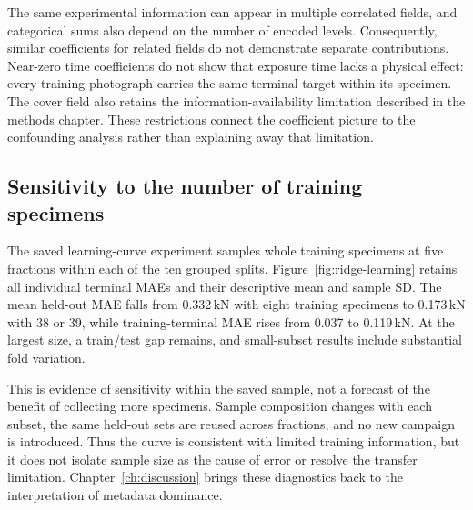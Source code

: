 The same experimental information can appear in multiple correlated fields, and categorical sums also depend on the number of encoded levels. Consequently, similar coefficients for related fields do not demonstrate separate contributions. Near-zero time coefficients do not show that exposure time lacks a physical effect: every training photograph carries the same terminal target within its specimen. The cover field also retains the information-availability limitation described in the methods chapter. These restrictions connect the coefficient picture to the confounding analysis rather than explaining away that limitation.

\subsection{Sensitivity to the number of training specimens}
The saved learning-curve experiment samples whole training specimens at five fractions within each of the ten grouped splits. Figure~\ref{fig:ridge-learning} retains all individual terminal MAEs and their descriptive mean and sample SD. The mean held-out MAE falls from 0.332\,kN with eight training specimens to 0.173\,kN with 38 or 39, while training-terminal MAE rises from 0.037 to 0.119\,kN. At the largest size, a train/test gap remains, and small-subset results include substantial fold variation.


This is evidence of sensitivity within the saved sample, not a forecast of the benefit of collecting more specimens. Sample composition changes with each subset, the same held-out sets are reused across fractions, and no new campaign is introduced. Thus the curve is consistent with limited training information, but it does not isolate sample size as the cause of error or resolve the transfer limitation. Chapter~\ref{ch:discussion} brings these diagnostics back to the interpretation of metadata dominance.

